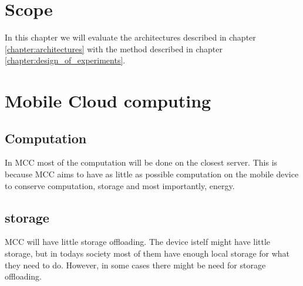 \section{Scope}
In this chapter we will evaluate the architectures described in chapter \ref{chapter:architectures} with the method described in chapter \ref{chapter:design_of_experiments}.



\section{Mobile Cloud computing}

\subsection{Computation}%
In MCC most of the computation will be done on the closest server. This is because MCC aims to have as little as possible computation on the mobile device to conserve computation, storage and most importantly, energy.

\subsection{storage}%
MCC will have little storage offloading. The device istelf might have little storage, but in todays society most of them have enough local storage for what they need to do. However, in some cases there might be need for storage offloading.